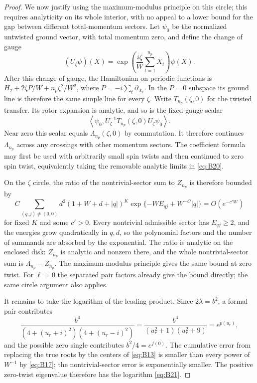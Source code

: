 \begin{proof}
We now justify using the maximum-modulus principle on this circle;
this requires analyticity on its whole interior, with no appeal to a
lower bound for the gap between different total-momentum sectors.
Let $\psi_0$ be the normalized untwisted ground vector, with total
momentum zero, and define the change of gauge
\[
 (U_\zeta\psi)(X)
 =\exp\!\left(\frac{i\zeta}{W}\sum_{t=1}^{n_p}X_t\right)\psi(X).
\]
After this change of gauge, the Hamiltonian on periodic functions is
$H_2+2\zeta P/W+n_p\zeta^2/W^2$, where
$P=-i\sum_t\partial_{X_t}$.  In the $P=0$ subspace its ground line is
therefore the same simple line for every $\zeta$.
Write $T_{n_p}(\zeta,0)$ for the twisted transfer.  Its rotor expansion
is analytic, and so is the fixed-gauge scalar
\[
 \left\langle\psi_0,
 U_\zeta^{-1}T_{n_p}(\zeta,0)U_\zeta\psi_0\right\rangle.
\]
Near zero this scalar equals $\Lambda_{n_p}(\zeta,0)$ by commutation.
It therefore continues $\Lambda_{n_p}$ across any crossings with
other momentum sectors.  The coefficient formula may first be used
with arbitrarily small spin twists and then continued to zero spin
twist, equivalently taking the removable analytic limits in
\eqref{eq:B20}.

On the $\zeta$ circle, the ratio of the nontrivial-sector sum to
$Z_{n_p}$ is therefore bounded by
\[
 C\sum_{(q,j)\ne(0,0)}
 d^2(1+W+d+|q|)^K
 \exp\{-WE_{qj}+W^{-C}|q|\}
 =O(e^{-c'W})
\]
for fixed $K$ and some $c'>0$.  Every nontrivial admissible sector has
$E_{qj}\ge2$, and the energies grow quadratically in $q,d$, so the
polynomial factors and the number of summands are absorbed by the
exponential.  The ratio is analytic on the enclosed disk:
$Z_{n_p}$ is analytic and nonzero there, and the whole nontrivial-sector
sum is $\Lambda_{n_p}-Z_{n_p}$.  The maximum-modulus principle gives
the same bound at zero twist.  For $\ell=0$ the separated pair factors
already give the bound directly; the same circle argument also applies.

It remains to take the logarithm of the leading product.  Since
$2\lambda=b^2$, a formal pair contributes
\[
 \frac{b^4}{(4+(u_r+i)^2)(4+(u_r-i)^2)}
 =\frac{b^4}{(u_r^2+1)(u_r^2+9)}=e^{p(u_r)},
\]
and the possible zero single contributes $b^2/4=e^{f(0)}$.
The cumulative error from replacing the true roots by the centers of
\eqref{eq:B13} is smaller than every power of $W^{-1}$ by
\eqref{eq:B17}; the nontrivial-sector error is exponentially smaller.
The positive zero-twist eigenvalue therefore has the logarithm
\eqref{eq:B21}.
\end{proof}

